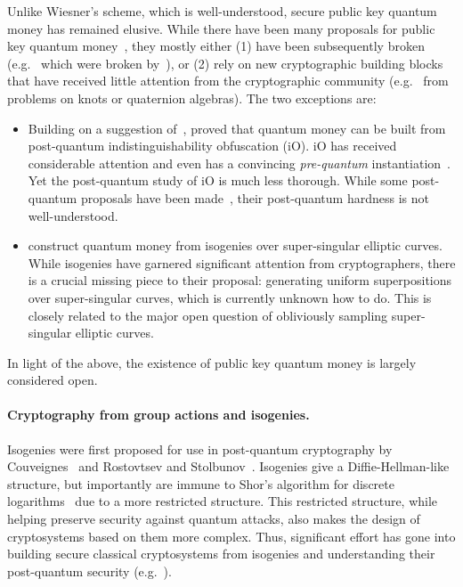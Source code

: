 \documentclass{article}\usepackage[a4paper,margin=20mm]{geometry}
\numberwithin{theorem}{section}
\numberwithin{equation}{section}
\begin{document}
Unlike Wiesner's scheme, which is well-understood, secure public key quantum money has remained elusive. While there have been many proposals for public key quantum money~\cite{CCC:Aaronson09,DBLP:journals/toc/AaronsonC13,ITCS:FGHLS12,Kane18,DBLP:journals/joc/Zhandry21,EPRINT:KanShaSil21,KLS22,EC:LiuMonZha23}, they mostly either (1) have been subsequently broken (e.g.~\cite{CCC:Aaronson09,DBLP:journals/toc/AaronsonC13,DBLP:journals/joc/Zhandry21,KLS22} which were broken by~\cite{ITCS:LAFGKH10,PDFHP19,EC:Roberts21,EC:LiuMonZha23}), or (2) rely on new cryptographic building blocks that have received little attention from the cryptographic community (e.g.~\cite{ITCS:FGHLS12,Kane18,EPRINT:KanShaSil21} from problems on knots or quaternion algebras). The two exceptions are:
\begin{itemize}
	\item Building on a suggestion of~\cite{BenSat16}, \cite{DBLP:journals/joc/Zhandry21} proved that quantum money can be built from post-quantum indistinguishability obfuscation (iO). iO has received considerable attention and even has a convincing \emph{pre-quantum} instantiation~\cite{DBLP:journals/cacm/JainLS24}. Yet the post-quantum study of iO is much less thorough. While some post-quantum proposals have been made~\cite{TCC:GenGorHal15,TCC:BGMZ18,EPRINT:BDGM20b,EC:WeeWic21}, their post-quantum hardness is not well-understood.
	\item \cite{EC:LiuMonZha23} construct quantum money from isogenies over super-singular elliptic curves. While isogenies have garnered significant attention from cryptographers, there is a crucial missing piece to their proposal: generating uniform superpositions over super-singular curves, which is currently unknown how to do. This is closely related to the major open question of obliviously sampling super-singular elliptic curves.
\end{itemize}
In light of the above, the existence of public key quantum money is largely considered open.



\paragraph{Cryptography from group actions and isogenies.} Isogenies were first proposed for use in post-quantum cryptography by Couveignes~\cite{EPRINT:Couveignes06} and Rostovtsev and Stolbunov~\cite{EPRINT:RosSto06}. Isogenies give a Diffie-Hellman-like structure, but importantly are immune to Shor's algorithm for discrete logarithms~\cite{FOCS:Shor94} due to a more restricted structure. This restricted structure, while helping preserve security against quantum attacks, also makes the design of cryptosystems based on them more complex. Thus, significant effort has gone into building secure classical cryptosystems from isogenies and understanding their post-quantum security (e.g.~\cite{CJS14,DJP14,AC:CLMPR18,AC:BeuKleVer19,CD20,PKC:DeFMey20,EC:Peikert20,EC:BonSch20,AC:ADMP20,TCC:AlaMalRah22,DBLP:journals/joc/MontgomeryZ24,EPRINT:MaiMar22,EC:CasDec23,EC:BonGuaZha23,EC:Robert23}).
\end{document}
